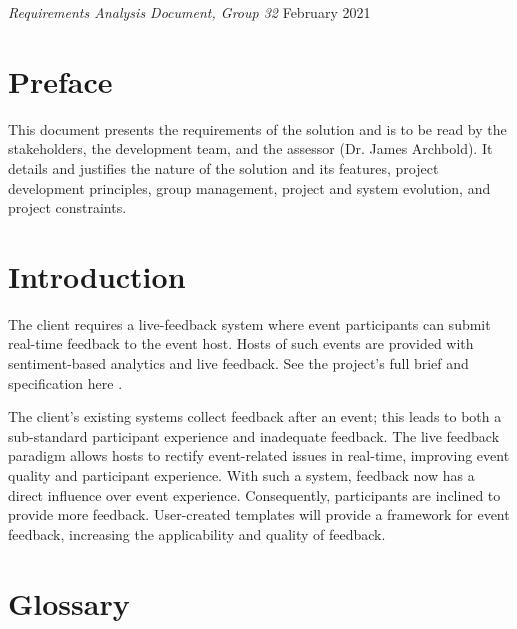 \documentclass[9pt, titlepage]{extarticle}
\begin{document}
\Large{
\emph{Requirements Analysis Document, Group 32}
\hfill
February 2021}
\normalsize{}
\section{Preface}

This document presents the requirements of the solution and is to be read by the stakeholders, the development team, and the assessor (Dr. James Archbold). 
It details and justifies the nature of the solution and its features, project development principles, group management, project and system evolution, and project constraints.

\section{Introduction}
The client requires a live-feedback system where event participants can submit real-time feedback to the event host. 
Hosts of such events are provided with sentiment-based analytics and live feedback. See the project’s full brief and specification here \autocite{web:spec}.\newline

The client’s existing systems collect feedback after an event; this leads to both a sub-standard participant experience and inadequate feedback. 
The live feedback paradigm allows hosts to rectify event-related issues in real-time, improving event quality and participant experience. 
With such a system, feedback now has a direct influence over event experience. Consequently, participants are inclined to provide more feedback. 
User-created templates will provide a framework for event feedback, increasing the applicability and quality of feedback. 

\section{Glossary}
\end{document}
